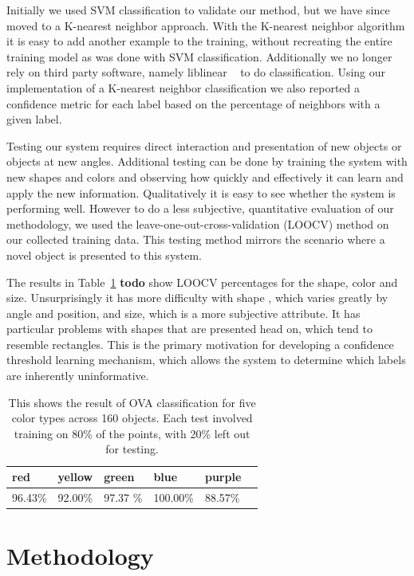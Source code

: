 \documentclass[11pt]{article}
\newcommand{\xxx}[1]{{\bf \color{red} #1}}
\newcommand\T{\rule{0pt}{3ex}}
\newcommand\B{\rule[-1.2ex]{0pt}{0pt}}
\begin{document}
Initially we used SVM classification to validate our method, but we have since 
moved to a K-nearest neighbor approach.  With the K-nearest neighbor algorithm 
it is easy to add another example to the training, without recreating the 
entire training model as was done with SVM classification.  Additionally we no 
longer rely on third party software, namely liblinear ~\cite{LIBLINEAR} to do 
classification.  Using our implementation of a K-nearest neighbor 
classification we also reported a confidence metric for each label based on the 
percentage of neighbors with a given label.

Testing our system requires direct interaction and presentation of new objects 
or objects at new angles.  Additional testing can be done by training the 
system with new shapes and colors and observing how quickly and effectively it 
can learn and apply the new information.  Qualitatively it is easy to see 
whether the system is performing well.  However to do a less subjective, 
quantitative evaluation of our methodology, we used the leave-one-out-cross-validation 
(LOOCV) method on our collected training data.  This testing method mirrors the 
scenario where a novel object is presented to this system.

The results in Table~\ref{tbl:testresults} \xxx{todo} show LOOCV percentages 
for the shape, color and size.  Unsurprisingly it has more difficulty with shape
, which varies greatly by angle and position, and size, which is a more 
subjective attribute. It has particular problems with shapes that are presented 
head on, which tend to resemble rectangles.  This is the primary motivation for 
developing a confidence threshold learning mechanism, which allows the system 
to determine which labels are inherently uninformative.


\begin{table}
\centering
\begin{tabular}{ | l | l | l | l | l | l |}
    \hline
    red &  yellow & green & blue & purple \T \B \\ \hline
    96.43\%  & 92.00\% & 97.37 \% & 100.00\% & 88.57\% \B \T \\ \hline
\end{tabular}
\caption{This shows the result of OVA classification for five color types
    across 160 objects. Each test involved training on 80\% of the points,
           with 20\% left out for testing.}
\label{tbl:testresults}
\end{table}

\section{Methodology}
\end{document}
